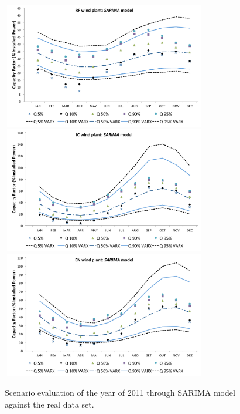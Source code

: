 \documentclass[a4paper]{IEEEtran}
\begin{document}
\begin{figure}[htbp]
\centering
\includegraphics[height=5.5cm,width=9.0cm]{figures/RF_COM_LOG.pdf}
\includegraphics[height=5.5cm,width=9.0cm]{figures/IC_COM_LOG.pdf}
\includegraphics[height=5.5cm,width=9.0cm]{figures/EN_COM_LOG.pdf}
\caption{Scenario evaluation of the year of 2011 through SARIMA model against the real data set.}
\label{analise_cenarios_SARIMA}
\end{figure}
\end{document}
